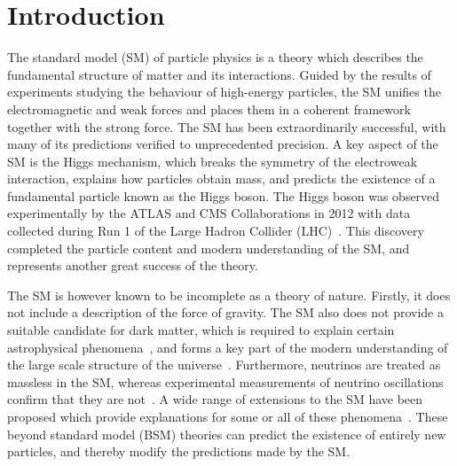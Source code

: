 \chapter{Introduction}
\label{chap:intro}

The standard model (SM) of particle physics is a theory which describes
the fundamental structure of matter and its interactions.
Guided by the results of experiments studying the behaviour of high-energy particles, 
the SM unifies the electromagnetic and weak forces and places them in a coherent framework
together with the strong force.
The SM has been extraordinarily successful, 
with many of its predictions verified to unprecedented precision.
A key aspect of the SM is the Higgs mechanism, 
which breaks the symmetry of the electroweak interaction, explains how particles obtain mass, 
and predicts the existence of a fundamental particle known as the Higgs boson.
The Higgs boson was observed experimentally by the ATLAS and CMS Collaborations in 2012
with data collected during Run 1 of the Large Hadron Collider (LHC)~\cite{ATLASdiscovery,CMSdiscovery}.
This discovery completed the particle content and modern understanding of the SM, 
and represents another great success of the theory.

The SM is however known to be incomplete as a theory of nature.
Firstly, it does not include a description of the force of gravity.
The SM also does not provide a suitable candidate for dark matter, 
which is required to explain certain astrophysical phenomena~\cite{BulletCluster},
and forms a key part of the modern understanding 
of the large scale structure of the universe~\cite{Planck}.
Furthermore, neutrinos are treated as massless in the SM, 
whereas experimental measurements of neutrino oscillations confirm that they are not~\cite{NeutrinoOscillation}.
A wide range of extensions to the SM have been proposed 
which provide explanations for some or all of these phenomena~\cite{SUSY}.
These beyond standard model (BSM) theories can predict the existence of entirely new particles, 
and thereby modify the predictions made by the SM.

